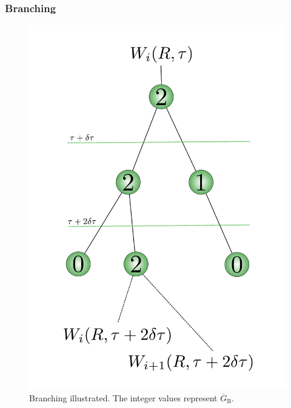 \begin{frame}
\frametitle{Branching}

\begin{figure}
\begin{center}
\includegraphics[scale=0.2]{../graphics/branching.pdf}
\end{center}
\caption{Branching illustrated. The integer values represent $\overline{G}_\mathrm{B}$.}
\end{figure}

\end{frame}

